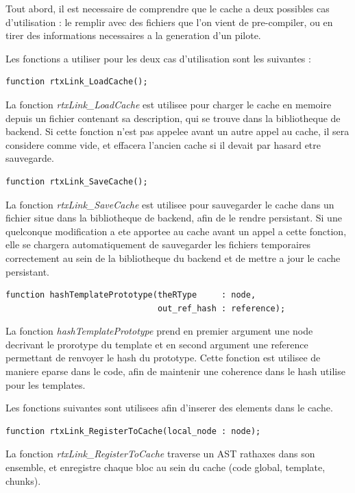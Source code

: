 \documentclass[french]{rtxreport}
\begin{document}
Tout abord, il est necessaire de comprendre que le cache a deux possibles cas
d'utilisation : le remplir avec des fichiers que l'on vient de pre-compiler, ou
en tirer des informations necessaires a la generation d'un pilote.

\vspace{20pt}

Les fonctions a utiliser pour les deux cas d'utilisation sont les suivantes :

\begin{lstlisting}
function rtxLink_LoadCache();
\end{lstlisting}
La fonction \emph{rtxLink\_LoadCache} est utilisee pour charger le cache en
memoire depuis un fichier contenant sa description, qui se trouve dans la
bibliotheque de backend. Si cette fonction n'est pas appelee avant un autre
appel au cache, il sera considere comme vide, et effacera l'ancien cache si il
devait par hasard etre sauvegarde.

\begin{lstlisting}
function rtxLink_SaveCache();
\end{lstlisting}
La fonction \emph{rtxLink\_SaveCache} est utilisee pour sauvegarder le cache
dans un fichier situe dans la bibliotheque de backend, afin de le rendre
persistant. Si une quelconque modification a ete apportee au cache avant un
appel a cette fonction, elle se chargera automatiquement de sauvegarder les
fichiers temporaires correctement au sein de la bibliotheque du backend et de
mettre a jour le cache persistant.

\begin{lstlisting}
function hashTemplatePrototype(theRType     : node,
                               out_ref_hash : reference);
\end{lstlisting}
La fonction \emph{hashTemplatePrototype} prend en premier argument une node
decrivant le prorotype du template et en second argument une reference
permettant de renvoyer le hash du prototype. Cette fonction est utilisee de
maniere eparse dans le code, afin de maintenir une coherence dans le hash
utilise pour les templates.

\vspace{20pt}

Les fonctions suivantes sont utilisees afin d'inserer des elements dans le
cache.

\begin{lstlisting}
function rtxLink_RegisterToCache(local_node : node);
\end{lstlisting}
La fonction \emph{rtxLink\_RegisterToCache} traverse un AST rathaxes dans son
ensemble, et enregistre chaque bloc au sein du cache (code global, template,
chunks).
\end{document}
